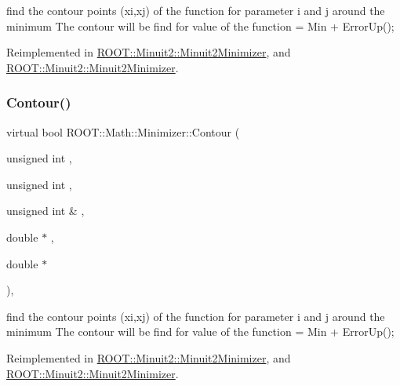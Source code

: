 find the contour points (xi,xj) of the function for parameter i and j around the minimum The contour will be find for value of the function = Min + Error\+Up(); 

Reimplemented in \mbox{\hyperlink{classROOT_1_1Minuit2_1_1Minuit2Minimizer_a026780c27dd4b179817f826f49e36c8e}{R\+O\+O\+T\+::\+Minuit2\+::\+Minuit2\+Minimizer}}, and \mbox{\hyperlink{classROOT_1_1Minuit2_1_1Minuit2Minimizer_a026780c27dd4b179817f826f49e36c8e}{R\+O\+O\+T\+::\+Minuit2\+::\+Minuit2\+Minimizer}}.

\mbox{\label{classROOT_1_1Math_1_1Minimizer_aeb8855190ff2e37911c38ed839f2043c}} 
\subsubsection{\texorpdfstring{Contour()}{Contour()}\hspace{0.1cm}{\footnotesize\ttfamily [2/2]}}
{\footnotesize\ttfamily virtual bool R\+O\+O\+T\+::\+Math\+::\+Minimizer\+::\+Contour (\begin{DoxyParamCaption}\item[{unsigned int}]{,  }\item[{unsigned int}]{,  }\item[{unsigned int \&}]{,  }\item[{double $\ast$}]{,  }\item[{double $\ast$}]{ }\end{DoxyParamCaption})\hspace{0.3cm}{\ttfamily [inline]}, {\ttfamily [virtual]}}

find the contour points (xi,xj) of the function for parameter i and j around the minimum The contour will be find for value of the function = Min + Error\+Up(); 

Reimplemented in \mbox{\hyperlink{classROOT_1_1Minuit2_1_1Minuit2Minimizer_a026780c27dd4b179817f826f49e36c8e}{R\+O\+O\+T\+::\+Minuit2\+::\+Minuit2\+Minimizer}}, and \mbox{\hyperlink{classROOT_1_1Minuit2_1_1Minuit2Minimizer_a026780c27dd4b179817f826f49e36c8e}{R\+O\+O\+T\+::\+Minuit2\+::\+Minuit2\+Minimizer}}.

\mbox{\label{classROOT_1_1Math_1_1Minimizer_a9ba2f4bc3c8c0e905f2c018e79809c0e}} 
